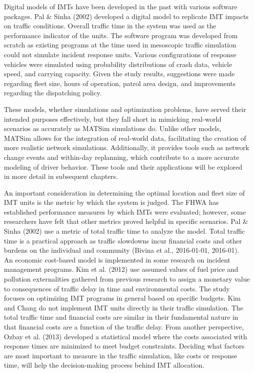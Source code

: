 \documentclass[fancy, oneside, mastersfancy, ms]{byuthesis}
\begin{document}
Digital models of IMTs have been developed in the past with various
software packages. Pal \& Sinha (2002) developed a digital model to
replicate IMT impacts on traffic conditions. Overall traffic time in the
system was used as the performance indicator of the units. The software
program was developed from scratch as existing programs at the time used
in mesoscopic traffic simulation could not simulate incident response
units. Various configurations of response vehicles were simulated using
probability distributions of crash data, vehicle speed, and carrying
capacity. Given the study results, suggestions were made regarding fleet
size, hours of operation, patrol area design, and improvements regarding
the dispatching policy.

These models, whether simulations and optimization problems, have served
their intended purposes effectively, but they fall short in mimicking
real-world scenarios as accurately as MATSim simulations do. Unlike
other models, MATSim allows for the integration of real-world data,
facilitating the creation of more realistic network simulations.
Additionally, it provides tools such as network change events and
within-day replanning, which contribute to a more accurate modeling of
driver behavior. These tools and their applications will be explored in
more detail in subsequent chapters.

An important consideration in determining the optimal location and fleet
size of IMT units is the metric by which the system is judged. The FHWA
has established performance measures by which IMTs were evaluated;
however, some researchers have felt that other metrics proved helpful in
specific scenarios. Pal \& Sinha (2002) use a metric of total traffic
time to analyze the model. Total traffic time is a practical approach as
traffic slowdowns incur financial costs and other burdens on the
individual and community (Bivina et al., 2016-01-01, 2016-01). An
economic cost-based model is implemented in some research on incident
management programs. Kim et al. (2012) use assumed values of fuel price
and pollution externalities gathered from previous research to assign a
monetary value to consequences of traffic delay in time and
environmental costs. The study focuses on optimizing IMT programs in
general based on specific budgets. Kim and Chang do not implement IMT
units directly in their traffic simulation. The total traffic time and
financial costs are similar in their fundamental nature in that
financial costs are a function of the traffic delay. From another
perspective, Ozbay et al. (2013) developed a statistical model where the
costs associated with response times are minimized to meet budget
constraints. Deciding what factors are most important to measure in the
traffic simulation, like costs or response time, will help the
decision-making process behind IMT allocation.
\end{document}
